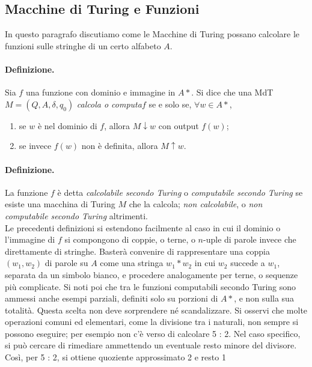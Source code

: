 \subsection{Macchine di Turing e Funzioni}

In questo paragrafo discutiamo come le Macchine di Turing possano calcolare le
funzioni sulle stringhe di un certo alfabeto $A$.

\paragraph{Definizione.}
Sia $f$ una funzione con dominio e immagine in $A*$. Si dice che una
MdT $M = (Q, A, \delta, q_0)$ \textit{calcola o computa}$f$ se e solo se, $\forall w \in A*$,

\begin{enumerate}
    \item se $w$ è nel dominio di $f$, allora $M \downarrow w$ con output $f(w)$;
    \item se invece $f(w)$ non è definita, allora $M \uparrow w$.
\end{enumerate}

\paragraph{Definizione.}
La funzione $f$ è detta \textit{calcolabile secondo Turing} o
\textit{computabile secondo Turing} se esiste una macchina di Turing $M$ che la
calcola; \textit{non calcolabile},
o \textit{non computabile secondo Turing} altrimenti.\\

Le precedenti definizioni si estendono facilmente al caso in cui il dominio o
l'immagine di $f$ si compongono di coppie, o terne, o $n$-uple di parole invece che
direttamente di stringhe. Basterà convenire di rappresentare una coppia $(w_1, w_2)$
di parole su $A$ come una stringa $w_1* w_2$ in cui $w_2$ succede a $w_1$, separata
da un simbolo bianco, e procedere analogamente per terne, o sequenze più complicate.
Si noti poi che tra le funzioni computabili secondo Turing sono ammessi anche
esempi parziali, definiti solo su porzioni di $A*$, e non sulla sua totalità.
Questa scelta non deve sorprendere né scandalizzare. Si osservi che molte operazioni
comuni ed elementari, come la divisione tra i naturali, non sempre si possono
eseguire; per esempio non c'è verso di calcolare 5 : 2. Nel caso specifico, si può
cercare di rimediare ammettendo un eventuale resto minore del divisore. Così, per
5 : 2, si ottiene quoziente approssimato 2 e resto 1


